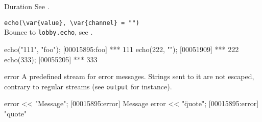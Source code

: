 \begin{urbiscriptapi}
\item[Duration] See .

\item \lstinline|echo(\var{value}, \var{channel} = "")|\\
  Bounce to \lstinline|lobby.echo|, see .
\begin{urbiscript}
echo("111", "foo");
[00015895:foo] *** 111
echo(222, "");
[00051909] *** 222
echo(333);
[00055205] *** 333
\end{urbiscript}

\item[error] A predefined stream for error messages.  Strings sent to it are not
  escaped, contrary to regular streams (see \lstinline|output| for
  instance).
\begin{urbiscript}
error << "Message";
[00015895:error] Message
error << "\"quote\"";
[00015895:error] "quote"
\end{urbiscript}



\end{urbiscriptapi}
